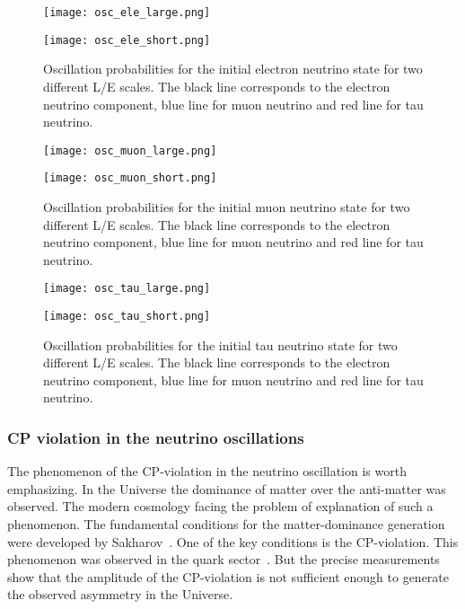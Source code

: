 \documentclass[../main.tex]{subfiles}
\begin{document}
\begin{figure}[!ht]
\centering
\begin{minipage}{0.4\linewidth}
  \centering
  \texttt{[image: osc\_ele\_large.png]}
\end{minipage}
\hfill
\begin{minipage}{0.4\linewidth}
  \centering
  \texttt{[image: osc\_ele\_short.png]}
\end{minipage}
\caption{Oscillation probabilities for the initial electron neutrino state for two different L/E scales. The black line corresponds to the electron neutrino component, blue line for muon neutrino and red line for tau neutrino.}
\label{fig:intro:osc1}
\end{figure}

\begin{figure}
\centering
\begin{minipage}{0.4\linewidth}
  \texttt{[image: osc\_muon\_large.png]}
\end{minipage}
\hfill
\begin{minipage}{0.4\linewidth}
  \texttt{[image: osc\_muon\_short.png]}
\end{minipage}
\caption{Oscillation probabilities for the initial muon neutrino state for two different L/E scales. The black line corresponds to the electron neutrino component, blue line for muon neutrino and red line for tau neutrino.}
\label{fig:intro:osc2}
\end{figure}

\begin{figure}
\centering
\begin{minipage}{0.4\linewidth}
  \texttt{[image: osc\_tau\_large.png]}
\end{minipage}
\hfill
\begin{minipage}{0.4\linewidth}
  \texttt{[image: osc\_tau\_short.png]}
\end{minipage}
\caption{Oscillation probabilities for the initial tau neutrino state for two different L/E scales. The black line corresponds to the electron neutrino component, blue line for muon neutrino and red line for tau neutrino.}
\label{fig:intro:osc3}
\end{figure}

\subsubsection{CP violation in the neutrino oscillations}
\label{sec:intro:cp}
The phenomenon of the CP-violation in the neutrino oscillation is worth emphasizing. In the Universe the dominance of matter over the anti-matter was observed. The modern cosmology facing the problem of explanation of such a phenomenon. The fundamental conditions for the matter-dominance generation were developed by Sakharov~\cite{Sakharov1967}. One of the key conditions is the CP-violation. This phenomenon was observed in the quark sector~\cite{Tanabashi2018}. But the precise measurements show that the amplitude of the CP-violation is not sufficient enough to generate the observed asymmetry in the Universe.
\end{document}
